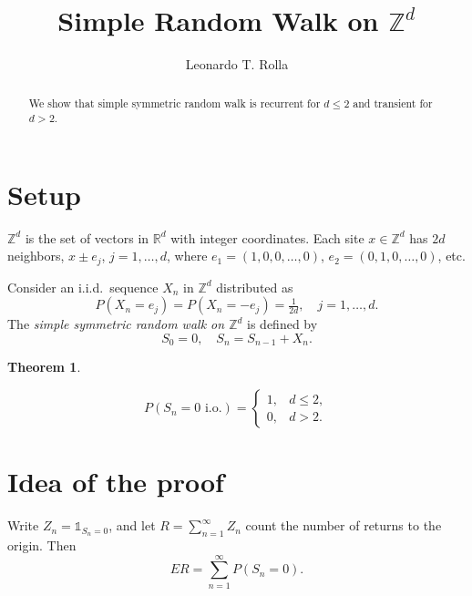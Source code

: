 \documentclass[a4paper,12pt]{article}
\newtheorem{theorem}[equation]{Theorem}
\theoremstyle{definition}
\newcommand{\I}{\mathds{1}}
\newcommand{\R}{\mathbb{R}}
\newcommand{\Z}{\mathbb{Z}}
\renewcommand{\leq}{\leqslant}
\renewcommand{\le}{\leqslant}
\begin{document}
\title{Simple Random Walk on $\Z^d$}
\author{Leonardo T. Rolla}
\maketitle

{\let\thefootnote\relax
{}}

\begin{abstract}
We show that simple symmetric random walk is recurrent for $d\le 2$ and transient for $d>2$.
\end{abstract}


\section*{Setup}

$\Z^d$ is the set of vectors in $\R^d$ with integer coordinates. Each site $x\in \Z^d$ has $2d$ neighbors, $x\pm e_j$, $j=1,\dots,d$, where $e_1=(1,0,0,\dots,0)$, $e_2=(0,1,0,\dots,0)$, etc.

Consider an i.i.d.\ sequence $X_n$ in $\Z^d$ distributed as
\[
P(X_n = e_j) = P(X_n = -e_j) = \tfrac{1}{2d}, \quad j=1,\dots,d.
\]
The \emph{simple symmetric random walk on $\Z^d$} is defined by
\[
S_0 = 0, \quad S_n = S_{n-1} + X_n.
\]

\begin{theorem}
\begin{singlespace}
\[
P(S_n = 0 \text{ i.o.}) =
\begin{cases}
1, & d \leq 2, \\
0, & d > 2.
\end{cases}
\]
\end{singlespace}
\end{theorem}


\section{Idea of the proof}

Write $Z_n = \I_{S_n=0}$, and let $R=\sum_{n=1}^{\infty} Z_n$ count the number of returns to the origin.
Then
\[
ER = \sum_{n=1}^{\infty} P(S_n=0)
.
\]
\end{document}

